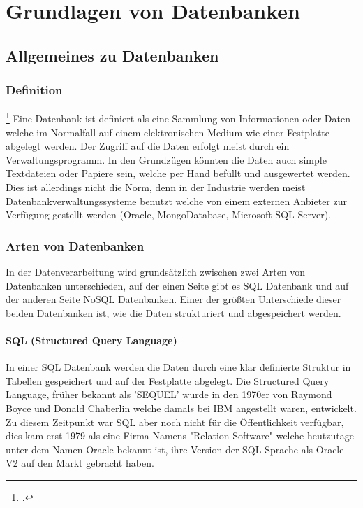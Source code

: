 \chapter{Grundlagen von Datenbanken}
\bauer
	\section{Allgemeines zu Datenbanken}
	\subsection{Definition}\footcite{oracle}
	Eine Datenbank ist definiert als eine Sammlung von Informationen oder Daten welche im Normalfall auf einem elektronischen Medium wie einer Festplatte abgelegt werden. 
	Der Zugriff auf die Daten erfolgt meist durch ein Verwaltungsprogramm. In den Grundzügen könnten die Daten auch simple Textdateien oder Papiere sein, welche per Hand befüllt und ausgewertet werden. 
	Dies ist allerdings nicht die Norm, denn in der Industrie werden meist Datenbankverwaltungssysteme benutzt welche von einem externen Anbieter zur Verfügung gestellt werden (Oracle, MongoDatabase, Microsoft SQL Server).	
	\subsection{Arten von Datenbanken}
	In der Datenverarbeitung wird grundsätzlich zwischen zwei Arten von Datenbanken unterschieden, auf der einen Seite gibt es SQL Datenbank und auf der anderen Seite NoSQL Datenbanken. 
	Einer der größten Unterschiede dieser beiden Datenbanken ist, wie die Daten strukturiert und abgespeichert werden.
	\subsubsection{SQL (Structured Query Language)} 
	In einer SQL Datenbank werden die Daten durch eine klar definierte Struktur in Tabellen gespeichert und auf der Festplatte abgelegt. 
	Die Structured Query Language, früher bekannt als 'SEQUEL' wurde in den 1970er von Raymond Boyce und Donald Chaberlin welche damals bei IBM angestellt waren, entwickelt. 
	Zu diesem Zeitpunkt war SQL aber noch nicht für die Öffentlichkeit verfügbar, dies kam erst 1979 als eine Firma Namens "Relation Software" welche heutzutage unter dem Namen Oracle bekannt ist, ihre Version der SQL Sprache als Oracle V2 auf den Markt gebracht haben.
